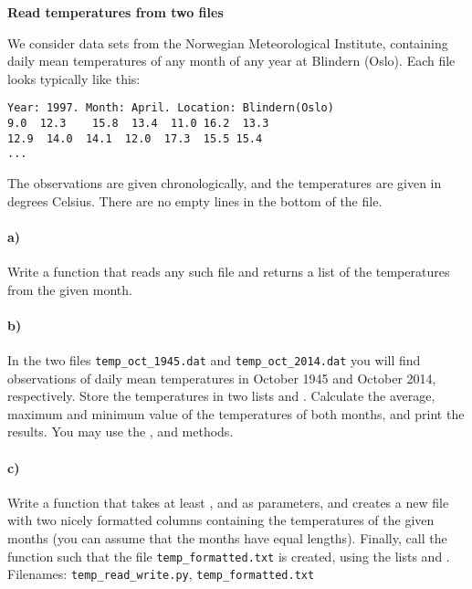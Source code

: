 \begin{Problem}{\textbf{Read temperatures from two files}}

\noindent
We consider data sets from the Norwegian Meteorological Institute, containing daily mean temperatures of any month of any year at Blindern (Oslo).\cite{temp} Each file looks typically like this:
\begin{lstlisting}
Year: 1997. Month: April. Location: Blindern(Oslo)
9.0  12.3    15.8  13.4  11.0 16.2  13.3
12.9  14.0  14.1  12.0  17.3  15.5 15.4
...
\end{lstlisting}
The observations are given chronologically, and the temperatures are given in degrees Celsius. There are no empty lines in the bottom of the file.

\paragraph{a)}
Write a function  that reads any such file and returns a list of the temperatures from the given month.
\paragraph{b)}
In the two files \texttt{temp\_oct\_1945.dat} and \texttt{temp\_oct\_2014.dat} you will find observations of daily mean temperatures in October 1945 and October 2014, respectively. Store the temperatures in two lists  and . Calculate the average, maximum and minimum value of the temperatures of both months, and print the results. You may use the ,  and  methods.
\paragraph{c)}
Write a function  that takes at least ,  and  as parameters, and creates a new file with two nicely formatted columns containing the temperatures of the given months (you can assume that the months have equal lengths).
Finally, call the function such that the file \texttt{temp\_formatted.txt} is created, using the lists  and .
\\
Filenames: \texttt{temp\_read\_write.py}, \texttt{temp\_formatted.txt}

\end{Problem}
